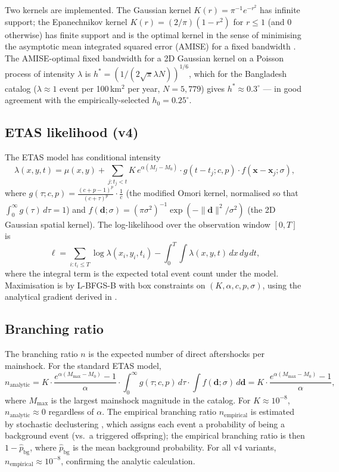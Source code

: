 \documentclass[10pt,a4paper,twocolumn]{article}
\begin{document}
Two kernels are implemented. The Gaussian kernel $K(r) = \pi^{-1} e^{-r^2}$ has infinite support; the Epanechnikov kernel $K(r) = (2/\pi)(1-r^2)$ for $r\leq 1$ (and 0 otherwise) has finite support and is the optimal kernel in the sense of minimising the asymptotic mean integrated squared error (AMISE) for a fixed bandwidth \cite{silverman1986}. The AMISE-optimal fixed bandwidth for a 2D Gaussian kernel on a Poisson process of intensity $\lambda$ is $h^* = (1/(2\sqrt{\pi}\lambda N))^{1/6}$, which for the Bangladesh catalog ($\lambda\approx 1$ event per 100\,km$^2$ per year, $N=5{,}779$) gives $h^*\approx 0.3^\circ$ --- in good agreement with the empirically-selected $h_0=0.25^\circ$.

\subsection{ETAS likelihood (v4)}\label{app:etas-likelihood}

The ETAS model has conditional intensity
\[
\lambda(x, y, t) = \mu(x, y) + \sum_{j: t_j < t} K\, e^{\alpha(M_j - M_0)} \cdot g(t - t_j; c, p) \cdot f(\mathbf{x} - \mathbf{x}_j; \sigma),
\]
where $g(\tau; c, p) = \frac{(c+p-1)^p}{(c+\tau)^p} \cdot \frac{1}{c}$ (the modified Omori kernel, normalised so that $\int_0^\infty g(\tau)\, d\tau = 1$) and $f(\mathbf{d}; \sigma) = (\pi \sigma^2)^{-1} \exp(-\|\mathbf{d}\|^2 / \sigma^2)$ (the 2D Gaussian spatial kernel). The log-likelihood over the observation window $[0, T]$ is
\[
\ell = \sum_{i: t_i \leq T} \log \lambda(x_i, y_i, t_i) - \int_0^T \!\!\int \lambda(x, y, t)\, dx\, dy\, dt,
\]
where the integral term is the expected total event count under the model. Maximisation is by L-BFGS-B with box constraints on $(K, \alpha, c, p, \sigma)$, using the analytical gradient derived in \cite{ogata1988}.

\subsection{Branching ratio}\label{app:branching-ratio}

The branching ratio $n$ is the expected number of direct aftershocks per mainshock. For the standard ETAS model,
\[
n_{\text{analytic}} = K \cdot \frac{e^{\alpha(M_{\max} - M_0)} - 1}{\alpha} \cdot \int_0^\infty g(\tau; c, p)\, d\tau \cdot \int f(\mathbf{d}; \sigma)\, d\mathbf{d} = K \cdot \frac{e^{\alpha(M_{\max} - M_0)} - 1}{\alpha},
\]
where $M_{\max}$ is the largest mainshock magnitude in the catalog. For $K\approx10^{-8}$, $n_{\text{analytic}}\approx 0$ regardless of $\alpha$. The empirical branching ratio $n_{\text{empirical}}$ is estimated by stochastic declustering \cite{zhuang2011}, which assigns each event a probability of being a background event (vs.\ a triggered offspring); the empirical branching ratio is then $1 - \hat p_{\text{bg}}$, where $\hat p_{\text{bg}}$ is the mean background probability. For all v4 variants, $n_{\text{empirical}} \approx 10^{-8}$, confirming the analytic calculation.
\end{document}
